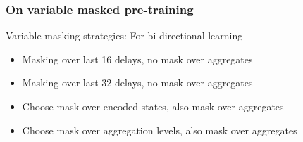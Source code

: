 \documentclass{beamer}
\begin{document}
\begin{frame}
\frametitle{On variable masked pre-training}

Variable masking strategies: For bi-directional learning
\pause
\begin{itemize}
    \item<1-> Masking over last 16 delays, no mask over aggregates
    \item<1-> Masking over last 32 delays, no mask over aggregates 
    \pause
    \item<2-> Choose mask over encoded states,  also mask over aggregates
     \item<2-> Choose mask over aggregation levels,  also mask over aggregates
\end{itemize}


\end{frame}
\end{document}
